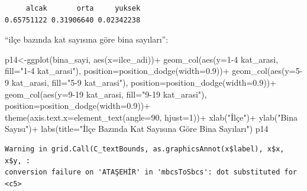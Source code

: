 \documentclass[
  11pt,
  a4paper,
  DIV=11,
  numbers=noendperiod]{scrartcl}
\newenvironment{Shaded}{\begin{snugshade}}{\end{snugshade}}
\newcommand{\AttributeTok}[1]{\textcolor[rgb]{0.40,0.45,0.13}{#1}}
\newcommand{\DecValTok}[1]{\textcolor[rgb]{0.68,0.00,0.00}{#1}}
\newcommand{\FloatTok}[1]{\textcolor[rgb]{0.68,0.00,0.00}{#1}}
\newcommand{\FunctionTok}[1]{\textcolor[rgb]{0.28,0.35,0.67}{#1}}
\newcommand{\NormalTok}[1]{\textcolor[rgb]{0.00,0.23,0.31}{#1}}
\newcommand{\OtherTok}[1]{\textcolor[rgb]{0.00,0.23,0.31}{#1}}
\newcommand{\SpecialCharTok}[1]{\textcolor[rgb]{0.37,0.37,0.37}{#1}}
\newcommand{\StringTok}[1]{\textcolor[rgb]{0.13,0.47,0.30}{#1}}
\begin{document}
\begin{verbatim}
     alcak       orta     yuksek 
0.65751122 0.31906640 0.02342238 
\end{verbatim}

``ilçe bazında kat sayısına göre bina sayıları'':

\begin{Shaded}
\begin{Highlighting}[]
\NormalTok{p14}\OtherTok{\textless{}{-}}\FunctionTok{ggplot}\NormalTok{(bina\_sayi, }\FunctionTok{aes}\NormalTok{(}\AttributeTok{x=}\NormalTok{ilce\_adi))}\SpecialCharTok{+}
  \FunctionTok{geom\_col}\NormalTok{(}\FunctionTok{aes}\NormalTok{(}\AttributeTok{y=}\StringTok{\textasciigrave{}}\AttributeTok{1{-}4 kat\_arasi}\StringTok{\textasciigrave{}}\NormalTok{, }\AttributeTok{fill=}\StringTok{"1{-}4 kat\_arasi"}\NormalTok{), }\AttributeTok{position=}\FunctionTok{position\_dodge}\NormalTok{(}\AttributeTok{width=}\FloatTok{0.9}\NormalTok{))}\SpecialCharTok{+}
  \FunctionTok{geom\_col}\NormalTok{(}\FunctionTok{aes}\NormalTok{(}\AttributeTok{y=}\StringTok{\textasciigrave{}}\AttributeTok{5{-}9 kat\_arasi}\StringTok{\textasciigrave{}}\NormalTok{, }\AttributeTok{fill=}\StringTok{"5{-}9 kat\_arasi"}\NormalTok{), }\AttributeTok{position=}\FunctionTok{position\_dodge}\NormalTok{(}\AttributeTok{width=}\FloatTok{0.9}\NormalTok{))}\SpecialCharTok{+}
  \FunctionTok{geom\_col}\NormalTok{(}\FunctionTok{aes}\NormalTok{(}\AttributeTok{y=}\StringTok{\textasciigrave{}}\AttributeTok{9{-}19 kat\_arasi}\StringTok{\textasciigrave{}}\NormalTok{, }\AttributeTok{fill=}\StringTok{"9{-}19 kat\_arasi"}\NormalTok{), }\AttributeTok{position=}\FunctionTok{position\_dodge}\NormalTok{(}\AttributeTok{width=}\FloatTok{0.9}\NormalTok{))}\SpecialCharTok{+}
  \FunctionTok{theme}\NormalTok{(}\AttributeTok{axis.text.x=}\FunctionTok{element\_text}\NormalTok{(}\AttributeTok{angle=}\DecValTok{90}\NormalTok{, }\AttributeTok{hjust=}\DecValTok{1}\NormalTok{))}\SpecialCharTok{+}
  \FunctionTok{xlab}\NormalTok{(}\StringTok{"İlçe"}\NormalTok{)}\SpecialCharTok{+}
  \FunctionTok{ylab}\NormalTok{(}\StringTok{"Bina Sayısı"}\NormalTok{)}\SpecialCharTok{+}
  \FunctionTok{labs}\NormalTok{(}\AttributeTok{title=}\StringTok{"İlçe Bazında Kat Sayısına Göre Bina Sayıları"}\NormalTok{)}
\NormalTok{p14}
\end{Highlighting}
\end{Shaded}

\begin{verbatim}
Warning in grid.Call(C_textBounds, as.graphicsAnnot(x$label), x$x, x$y, :
conversion failure on 'ATAŞEHİR' in 'mbcsToSbcs': dot substituted for <c5>
\end{verbatim}
\end{document}
